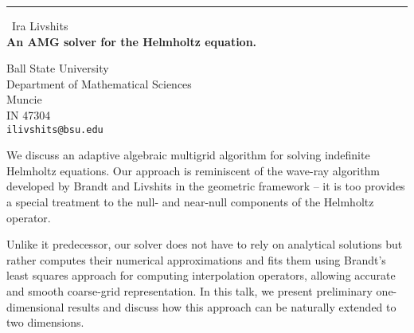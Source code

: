 \documentclass{report}
\begin{document}
\begin{center}
\rule{6in}{1pt} \
{\large Ira Livshits \\
{\bf An AMG solver for the Helmholtz equation. }}

Ball State University \\ Department of Mathematical Sciences \\ Muncie \\ IN 47304
\\
{\tt ilivshits@bsu.edu}\end{center}

We discuss an adaptive algebraic multigrid algorithm for solving
indefinite Helmholtz equations. Our approach is reminiscent of the
wave-ray algorithm developed by Brandt and Livshits in the geometric
framework -- it is too provides a special treatment to the null- and
near-null components of the Helmholtz operator.

Unlike it predecessor, our solver
does not have to rely on analytical solutions but rather computes their
numerical approximations and fits them using Brandt's least squares
approach for computing interpolation operators, allowing accurate and
smooth coarse-grid representation. In this talk, we present preliminary
one-dimensional results and discuss how this approach can be naturally
extended to two dimensions.
\end{document}
